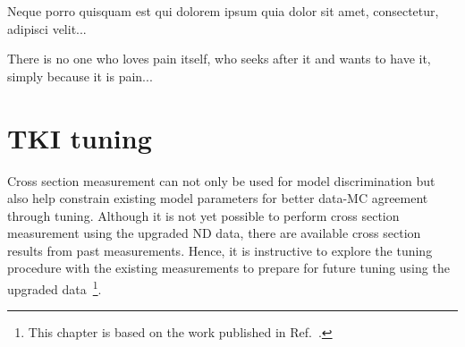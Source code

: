 \begin{savequote}[8cm]
\textlatin{Neque porro quisquam est qui dolorem ipsum quia dolor sit amet, consectetur, adipisci velit...}

There is no one who loves pain itself, who seeks after it and wants to have it, simply because it is pain...
\end{savequote}

\chapter{\label{ch:tuning}TKI tuning}

\minitoc

Cross section measurement can not only be used for model discrimination but also help constrain existing model parameters for better data-MC agreement through tuning. 
Although it is not yet possible to perform cross section measurement using the upgraded ND data, there are available cross section results from past measurements. 
Hence, it is instructive to explore the tuning procedure with the existing measurements to prepare for future tuning using the upgraded data~\footnote{This chapter is based on the work published in Ref.~\cite{GENIE:2024ufm}.}. 


